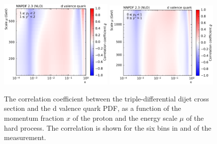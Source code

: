 \begin{figure}[htbp]
    \includegraphics[width=0.49\textwidth]{figures/pdf_constraints/corr_PTMAXEXPYS_YBYS_NLO_FINALBINS_NNPDF23_d_valence_quark_ys1_0yb1_0_cl.pdf}\hfill
    \includegraphics[width=0.49\textwidth]{figures/pdf_constraints/corr_PTMAXEXPYS_YBYS_NLO_FINALBINS_NNPDF23_d_valence_quark_ys0_0yb0_0_cl.pdf}\hfill
    \caption[Correlation between dijet cross section and d valence quark PDF]{
            The correlation coefficient between the triple-differential dijet cross
            section and the d valence quark PDF, as a function of the momentum fraction $x$ of the
            proton and the energy scale $\mu$ of the hard process. The correlation is shown
            for the six bins in \ystar and \yboost of the measurement.}
    \label{fig:pdfconstraints_d_valence_quark}
\end{figure}

